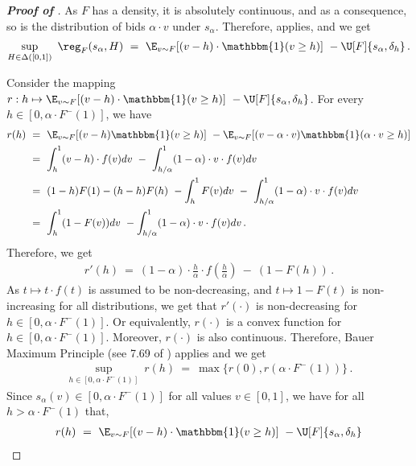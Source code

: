 \begin{proof}[\textbf{Proof of }]
	As $F$ has a density, it is absolutely continuous, and as a consequence, so is the distribution of bids $\alpha \cdot v$ under $s_\alpha$. Therefore,  applies, and we get
	\begin{align*}
		\sup_{H \in \Delta([0,1])}\ \reg_F(s_\alpha, H)\ =\ \E_{v \sim F}[(v - h) \cdot \mathbbm{1}(v \geq h)]\ - \U[F]{s_\alpha, \delta_h} \,.
	\end{align*}
	
	Consider the mapping $r : h 
     \mapsto \E_{v \sim F}[(v - h) \cdot \mathbbm{1}(v \geq h)]\ - \U[F]{s_\alpha, \delta_h}$. For every $h \in [0, \alpha \cdot F^{-}(1)]$, we have
	\begin{align*}
	 r(h) \ &=\ \E_{v \sim F}[(v - h) \mathbbm{1}(v \geq h)]\ -  \E_{v \sim F}[(v - \alpha \cdot v) \mathbbm{1}(\alpha \cdot v \geq h)]\\
		&=\ \int_h^1 (v - h) \cdot f(v) dv\ -\ \int_{h/\alpha}^1 (1 - \alpha) \cdot v \cdot f(v)  dv\\
		&=\ (1 - h)F(1) - (h-h)F(h)\ - \int_h^1 F(v)dv\ -\ \int_{h/\alpha}^1 (1 - \alpha) \cdot v \cdot f(v)  dv\\
		&=\ \int_h^1(1 - F(v))dv\ - \int_{h/\alpha}^1 (1 - \alpha) \cdot v \cdot f(v)  dv\,.
	\end{align*}
	Therefore, we get
	\begin{align*}
		r'(h)\ =\ (1 - \alpha) \cdot \frac{h}{\alpha} \cdot f\left( \frac{h}{\alpha}\right)\ -\ (1 - F(h))\,.
	\end{align*}
	As $t \mapsto t \cdot f(t)$ is assumed to be non-decreasing, and $t \mapsto 1 - F(t)$ is non-increasing for all distributions, we get that $r'(\cdot)$ is non-decreasing for $h \in [0, \alpha \cdot F^-(1)]$. Or equivalently, $r(\cdot)$ is a convex function for $h \in [0, \alpha \cdot F^-(1)]$. Moreover, $r(\cdot)$ is also continuous. Therefore, Bauer Maximum Principle (see 7.69 of \citealt{aliprantis2006infinite}) applies and we get
	\begin{align*}
		\sup_{h \in [0, \alpha \cdot F^-(1)]}\ r(h) \ =\ \max\{r(0), r(\alpha \cdot F^-(1))\}\,.
	\end{align*}
	Since $s_\alpha(v) \in [0,\alpha \cdot F^-(1)]$ for all values $v \in [0,1]$, we have for all $h > \alpha \cdot F^-(1)$ that,
	\begin{align*}
		r(h) \ &= \ \E_{v \sim F}[(v - h) \cdot \mathbbm{1}(v \geq h)]\ - \U[F]{s_\alpha, \delta_h}\\

\end{align*}
\end{proof}
